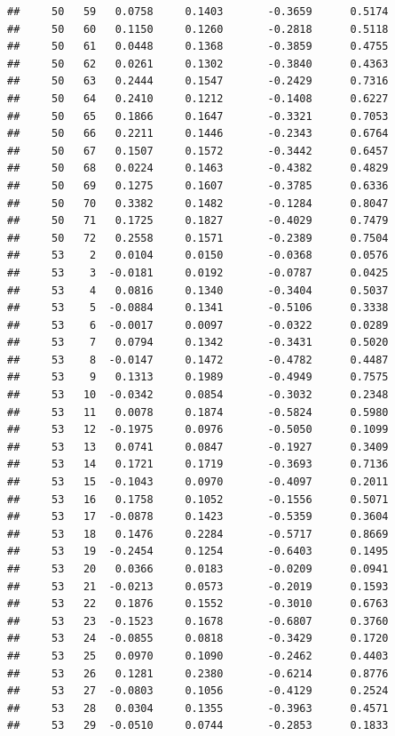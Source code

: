 \documentclass[
]{article}
\begin{document}
\begin{verbatim}
##     50   59   0.0758     0.1403       -0.3659      0.5174  
##     50   60   0.1150     0.1260       -0.2818      0.5118  
##     50   61   0.0448     0.1368       -0.3859      0.4755  
##     50   62   0.0261     0.1302       -0.3840      0.4363  
##     50   63   0.2444     0.1547       -0.2429      0.7316  
##     50   64   0.2410     0.1212       -0.1408      0.6227  
##     50   65   0.1866     0.1647       -0.3321      0.7053  
##     50   66   0.2211     0.1446       -0.2343      0.6764  
##     50   67   0.1507     0.1572       -0.3442      0.6457  
##     50   68   0.0224     0.1463       -0.4382      0.4829  
##     50   69   0.1275     0.1607       -0.3785      0.6336  
##     50   70   0.3382     0.1482       -0.1284      0.8047  
##     50   71   0.1725     0.1827       -0.4029      0.7479  
##     50   72   0.2558     0.1571       -0.2389      0.7504  
##     53    2   0.0104     0.0150       -0.0368      0.0576  
##     53    3  -0.0181     0.0192       -0.0787      0.0425  
##     53    4   0.0816     0.1340       -0.3404      0.5037  
##     53    5  -0.0884     0.1341       -0.5106      0.3338  
##     53    6  -0.0017     0.0097       -0.0322      0.0289  
##     53    7   0.0794     0.1342       -0.3431      0.5020  
##     53    8  -0.0147     0.1472       -0.4782      0.4487  
##     53    9   0.1313     0.1989       -0.4949      0.7575  
##     53   10  -0.0342     0.0854       -0.3032      0.2348  
##     53   11   0.0078     0.1874       -0.5824      0.5980  
##     53   12  -0.1975     0.0976       -0.5050      0.1099  
##     53   13   0.0741     0.0847       -0.1927      0.3409  
##     53   14   0.1721     0.1719       -0.3693      0.7136  
##     53   15  -0.1043     0.0970       -0.4097      0.2011  
##     53   16   0.1758     0.1052       -0.1556      0.5071  
##     53   17  -0.0878     0.1423       -0.5359      0.3604  
##     53   18   0.1476     0.2284       -0.5717      0.8669  
##     53   19  -0.2454     0.1254       -0.6403      0.1495  
##     53   20   0.0366     0.0183       -0.0209      0.0941  
##     53   21  -0.0213     0.0573       -0.2019      0.1593  
##     53   22   0.1876     0.1552       -0.3010      0.6763  
##     53   23  -0.1523     0.1678       -0.6807      0.3760  
##     53   24  -0.0855     0.0818       -0.3429      0.1720  
##     53   25   0.0970     0.1090       -0.2462      0.4403  
##     53   26   0.1281     0.2380       -0.6214      0.8776  
##     53   27  -0.0803     0.1056       -0.4129      0.2524  
##     53   28   0.0304     0.1355       -0.3963      0.4571  
##     53   29  -0.0510     0.0744       -0.2853      0.1833  

\end{verbatim}
\end{document}
